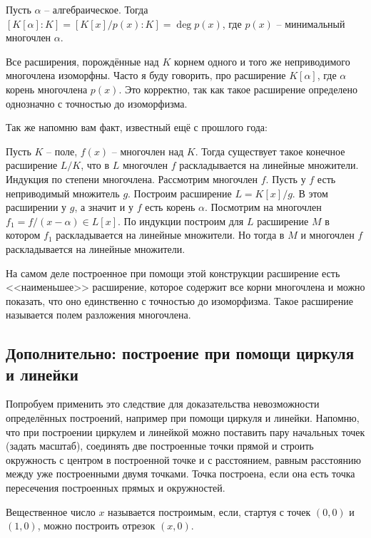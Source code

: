 \crl Пусть $\alpha$ -- алгебраическое. Тогда $ [K[\alpha]:K]= [K[x]/p(x):K]= \deg p(x)$, где $p(x)$ -- минимальный многочлен $\alpha$.
\ecrl

\crl Все расширения, порождённые над $K$ корнем одного и того же неприводимого многочлена изоморфны. Часто я буду говорить, про расширение $K[\alpha]$, где $\alpha$ корень многочлена $p(x)$. Это корректно, так как такое расширение определено однозначно с точностью до изоморфизма.
\ecrl

Так же напомню вам факт, известный ещё с прошлого года:

\utv Пусть $K$ -- поле, $f(x)$ -- многочлен над $K$. Тогда существует такое конечное расширение $L/K$, что в $L$ многочлен $f$ раскладывается на линейные множители.
\eutv
\proof Индукция по степени многочлена. Рассмотрим многочлен $f$. Пусть у $f$ есть неприводимый множитель $g$. Построим расширение $L=K[x]/g$. В этом расширении у $g$, а значит и у $f$ есть корень $\alpha$. Посмотрим на многочлен $f_1=f/(x-\alpha) \in L[x]$. По индукции построим для $L$ расширение $M$ в котором $f_1$ раскладывается на линейные множители. Но тогда в $M$ и многочлен $f$ раскладывается на линейные множители.
\endproof

На самом деле построенное при помощи этой конструкции расширение есть <<наименьшее>> расширение, которое содержит все корни многочлена и можно показать, что оно единственно с точностью до изоморфизма. Такое расширение называется полем разложения многочлена.


\subsection{Дополнительно: построение при помощи циркуля и линейки}
Попробуем применить это следствие для доказательства невозможности определённых  построений, например при помощи циркуля и линейки. Напомню, что при построении циркулем и линейкой можно поставить пару начальных точек (задать масштаб), соединять две построенные  точки прямой и строить окружность с центром в построенной точке и с расстоянием, равным расстоянию между уже построенными двумя точками. Точка построена, если она есть точка пересечения построенных прямых и окружностей. 

Вещественное число $x$ называется построимым, если, стартуя с точек $(0,0)$ и $(1,0)$, можно построить отрезок $(x,0)$. 

